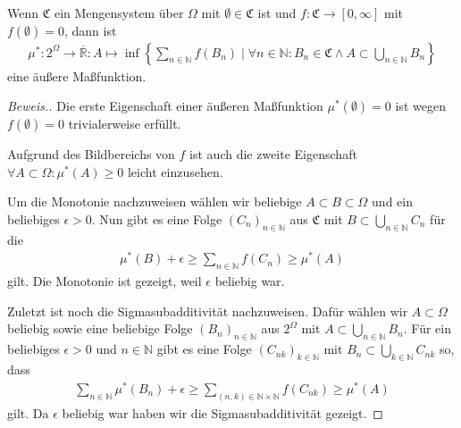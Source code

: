 \begin{lemma}
    Wenn $\mathfrak{C}$ ein Mengensystem über $\Omega$ mit $\emptyset\in\mathfrak{C}$ ist und $f:\mathfrak{C}\rightarrow[0,\infty]$ mit $f(\emptyset)=0$, dann ist 
    \begin{align*}
        \mu^*:2^\Omega\rightarrow\overline{\mathbb{R}}:A\mapsto\inf\left\{\sum_{n\in\mathbb{N}}f(B_n)\mid\forall n\in\mathbb{N}:B_n\in\mathfrak{C}\land A\subset\bigcup_{n\in\mathbb{N}}B_n\right\}
    \end{align*}
    eine äußere Maßfunktion.
\end{lemma}
\begin{proof}[Beweis.]
    Die erste Eigenschaft einer äußeren Maßfunktion $\mu^*(\emptyset)=0$ ist wegen $f(\emptyset)=0$ trivialerweise erfüllt.

    Aufgrund des Bildbereichs von $f$ ist auch die zweite Eigenschaft $\forall A\subset\Omega:\mu^*(A)\geq0$ leicht einzusehen.

    Um die Monotonie nachzuweisen wählen wir beliebige $A\subset B\subset\Omega$ und ein beliebiges $\epsilon>0$. Nun gibt es eine Folge $(C_n)_{n\in\mathbb{N}}$ aus $\mathfrak{C}$ mit $B\subset\bigcup_{n\in\mathbb{N}}C_n$ für die
    \begin{align*}
        \mu^*(B)+\epsilon\geq\sum_{n\in\mathbb{N}}f(C_n)\geq\mu^*(A)
    \end{align*}
    gilt. Die Monotonie ist gezeigt, weil $\epsilon$ beliebig war.

    Zuletzt ist noch die Sigmasubadditivität nachzuweisen. Dafür wählen wir $A\subset\Omega$ beliebig sowie eine beliebige Folge $(B_n)_{n\in\mathbb{N}}$ aus $2^\Omega$ mit $A\subset\bigcup_{n\in\mathbb{N}}B_n$. Für ein beliebiges $\epsilon>0$ und $n\in\mathbb{N}$ gibt es eine Folge $(C_{nk})_{k\in\mathbb{N}}$ mit $B_n\subset\bigcup_{k\in\mathbb{N}}C_{nk}$ so, dass
    \begin{align*}
        \sum_{n\in\mathbb{N}}\mu^*(B_n)+\epsilon\geq\sum_{(n,k)\in\mathbb{N}\times\mathbb{N}}f(C_{nk})\geq\mu^*(A)
    \end{align*}
    gilt. Da $\epsilon$ beliebig war haben wir die Sigmasubadditivität gezeigt.
\end{proof}